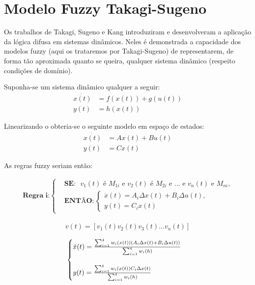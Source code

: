 \section{Modelo Fuzzy Takagi-Sugeno} \label{secTakSug}
Os trabalhos de Takagi, Sugeno \cite{takagiSugeno} e Kang \cite{kang} introduziram e desenvolveram a aplicação da lógica difusa em sistemas dinâmicos. Neles é demonstrada a capacidade dos modelos fuzzy (aqui os trataremos por Takagi-Sugeno) de representarem, de forma tão aproximada quanto se queira, qualquer sistema dinâmico (respeito condições de domínio). 

Suponha-se um sistema dinâmico qualquer a seguir:
\begin{align}
	\dot{x(t)} &= f(x(t)) + g(u(t)) \\
	y(t) &= h(x(t))
\end{align}

Linearizando o obteria-se o seguinte modelo em espaço de estados:
\begin{align}
	\dot{x(t)} &= Ax(t) + Bu(t) \\
	y(t) &= Cx(t)
\end{align}

As regras fuzzy seriam então:


\begin{align} \label{eqRegraIGeral}
	\textbf{Regra i:}
	\begin{cases}
		&\textbf{SE:} \text{ $v_1(t)$ é $M_{1i}$ e $v_2(t)$ é $M_{2i}$ e ... e $v_n(t)$ e $M_{ni}$,} \\
		&\textbf{ENTÃO}:
		\begin{cases}
			\dot{x}(t) = A_i \Delta x(t) + B_i \Delta u(t),\\
			y(t) = C_ix(t)
		\end{cases}
	\end{cases}
\end{align}

\begin{align}
	v(t) = [v_1(t) v_2(t) v_3(t) ... v_n(t)]
\end{align}
	
\begin{align}
	\begin{cases}
		\dot{x}(t) = \frac{\sum_{i=1}^{4}  w_i(x(t))(A_i \Delta x(t) +  B_i \Delta u(t))}{\sum_{i=1}^{4} w_i(h)} \vspace{0.5cm}\\
		y(t) = \frac{\sum_{i=1}^{4}  w_i(x(t)) C_i \Delta x(t)}{\sum_{i=1}^{4} w_i(h)}
	\end{cases}
\end{align}

%

